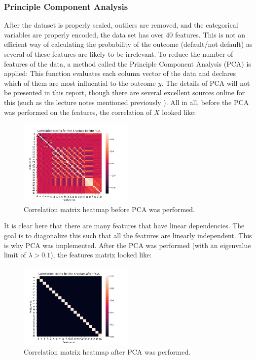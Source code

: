         \subsubsection{Principle Component Analysis}
            After the dataset is properly scaled, outliers are removed, and the categorical variables are properly encoded, the data set has over 40 features. This is not an efficient way of calculating the probability of the outcome (default/not default) as several of these features are likely to be irrelevant. To reduce the number of features of the data, a method called the Principle Component Analysis (PCA) is applied: This function evaluates each column vector of the data and declares which of them are most influential to the outcome $y$. The details of PCA will not be presented in this report, though there are several excellent sources online for this (such as the lecture notes mentioned previously \cite{lecturenotes}). All in all, before the PCA was performed on the features, the correlation of $X$ looked like:
            \begin{figure}[H]
                \centering
                \includegraphics[width=0.5\textwidth]{figures/corr_pre-PCA.png}
                \caption{Correlation matrix heatmap before PCA was performed. }
                \label{fig:pre_PCA}
            \end{figure}
            It is clear here that there are many features that have linear dependencies. The goal is to diagonalize this such that all the features are linearly independent. This is why PCA was implemented. After the PCA was performed (with an eigenvalue limit of $\lambda > 0.1$), the features matrix looked like:
            \begin{figure}[H]
                \centering
                \includegraphics[width=0.5\textwidth]{figures/corr_post-PCA.png}
                \caption{Correlation matrix heatmap after PCA was performed. }
                \label{fig:post_PCA}
            \end{figure}
